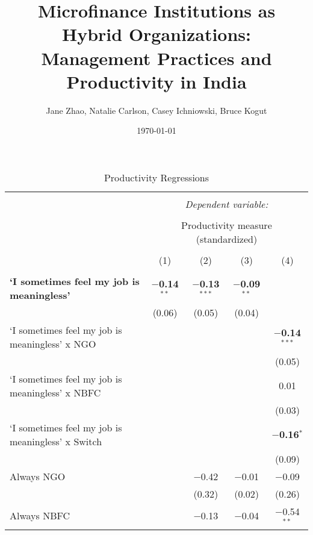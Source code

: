 \documentclass[11pt]{article}
\begin{document}
\title{Microfinance Institutions as Hybrid Organizations: Management Practices and Productivity in India}

\author{Jane Zhao, Natalie Carlson, Casey Ichniowski, Bruce Kogut}
\date{\today}

\maketitle

\begin{table}[!htbp] \centering 
  \caption{Productivity Regressions} 
  \label{} 
\footnotesize 
\begin{tabular}{@{\extracolsep{5pt}}lcccc} 
\\[-1.8ex]\hline 
\hline \\[-1.8ex] 
 & \multicolumn{4}{c}{\textit{Dependent variable:}} \\ 
\cline{2-5} 
\\[-1.8ex] & \multicolumn{4}{c}{Productivity measure (standardized)} \\ 
\\[-1.8ex] & (1) & (2) & (3) & (4)\\ 
\hline \\[-1.8ex] 
 \textbf{`I sometimes feel my job is meaningless'} & \textbf{$-$0.14$^{**}$} & \textbf{$-$0.13$^{***}$} & \textbf{$-$0.09$^{**}$} &  \\ 
  & (0.06) & (0.05) & (0.04) &  \\ 
  `I sometimes feel my job is meaningless' x NGO &  &  &  & \textbf{$-$0.14$^{***}$} \\ 
  &  &  &  & (0.05) \\ 
  `I sometimes feel my job is meaningless' x NBFC &  &  &  & 0.01 \\ 
  &  &  &  & (0.03) \\ 
  `I sometimes feel my job is meaningless' x Switch &  &  &  & \textbf{$-$0.16$^{*}$} \\ 
  &  &  &  & (0.09) \\ 
  Always NGO &  & $-$0.42 & $-$0.01 & $-$0.09 \\ 
  &  & (0.32) & (0.02) & (0.26) \\ 
  Always NBFC &  & $-$0.13 & $-$0.04 & $-$0.54$^{**}$ \\ 

\end{tabular}
\end{table}
\end{document}
